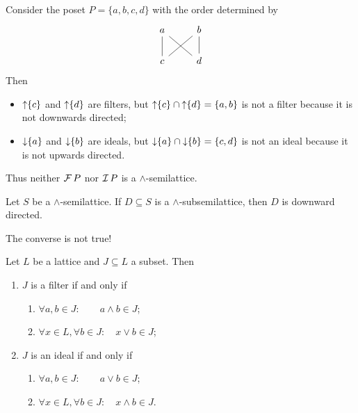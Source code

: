 \begin{example}
Consider the poset $P = \{a,b,c,d\}$ with the order determined by
\[ \begin{tikzcd}
a \ar[d, dash] \ar[dr, dash] & b \ar[d, dash] \ar[dl, dash] \\
c & d
\end{tikzcd} \]
Then
\begin{itemize}
\item $\operatorname{\uparrow} \{c\}$ and $\operatorname{\uparrow} \{d\}$ are filters, but $\operatorname{\uparrow} \{c\} \cap \operatorname{\uparrow} \{d\} = \{a,b\}$ is not a filter because it is not downwards directed;
\item $\operatorname{\downarrow} \{a\}$ and $\operatorname{\downarrow} \{b\}$ are ideals, but $\operatorname{\downarrow} \{a\} \cap \operatorname{\downarrow} \{b\} = \{c,d\}$ is not an ideal because it is not upwards directed.
\end{itemize}
Thus neither $\operatorname{\mathcal{F}}{P}$ nor $\operatorname{\mathcal{I}}{P}$ is a $\wedge$-semilattice.
\end{example}

\begin{lemma}
Let $S$ be a $\wedge$-semilattice. If $D\subseteq S$ is a $\wedge$-subsemilattice, then $D$ is downward directed.
\end{lemma}
The converse is not true!



\begin{lemma}
Let $L$ be a lattice and $J\subseteq L$ a subset. Then
\begin{enumerate}
\item $J$ is a filter \textup{if and only if}
\begin{enumerate}
\item $\forall a,b\in J: \qquad a\wedge b\in J$;
\item $\forall x\in L, \forall b\in J: \quad x\vee b \in J$;
\end{enumerate}
\item $J$ is an ideal \textup{if and only if}
\begin{enumerate}
\item $\forall a,b\in J: \qquad a\vee b\in J$;
\item $\forall x\in L, \forall b\in J: \quad x\wedge b \in J$.
\end{enumerate}
\end{enumerate}
\end{lemma}

